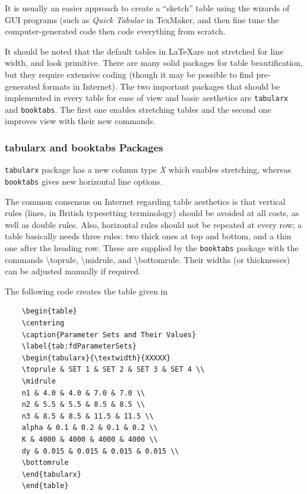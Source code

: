 \documentclass[10pt, a4paper]{article}
\begin{document}
It is usually an easier approach to create a ``sketch'' table using the wizards of GUI programs (such as \emph{Quick Tabular} in TexMaker, and then fine tune the computer-generated code then code everything from scratch. 

It should be noted that the default tables in \LaTeX are not stretched for line width, and look primitive. There are many solid packages for table beautification, but they require extensive coding (though it may be possible to find pre-generated formats in Internet). The two important packages that should be implemented in every table for ease of view and basic aesthetics are \texttt{tabularx} and \texttt{booktabs}. The first one enables stretching tables and the second one improves view with their new commands.

\subsubsection{tabularx and booktabs Packages}
\texttt{tabularx} package has a new column type \textit{X} which enables stretching, whereas \texttt{booktabs} gives new horizontal line options.

The common consensus on Internet regarding table aesthetics is that vertical rules (lines, in British typesetting terminology) should be avoided at all costs, as well as double rules. Also, horizontal rules should not be repeated at every row; a table basically needs three rules: two thick ones at top and bottom, and a thin one after the heading row. These are supplied by the \texttt{booktabs} package with the commands \textbackslash toprule, \textbackslash midrule, and \textbackslash bottomrule. Their widths (or thicknesses) can be adjusted manually if required. 

The following code creates the table given in 
\begin{verbatim}
	\begin{table}
	\centering
	\caption{Parameter Sets and Their Values}
	\label{tab:fdParameterSets}
	\begin{tabularx}{\textwidth}{XXXXX}
	\toprule & SET 1 & SET 2 & SET 3 & SET 4 \\ 
	\midrule  
	n1 & 4.0 & 4.0 & 7.0 & 7.0 \\
	n2 & 5.5 & 5.5 & 8.5 & 8.5 \\ 
	n3 & 8.5 & 8.5 & 11.5 & 11.5 \\ 
	alpha & 0.1 & 0.2 & 0.1 & 0.2 \\ 
	K & 4000 & 4000 & 4000 & 4000 \\ 
	dy & 0.015 & 0.015 & 0.015 & 0.015 \\
	\bottomrule
	\end{tabularx}
	\end{table}
\end{verbatim}
\end{document}
